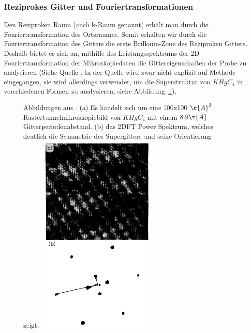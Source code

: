 \subsubsection{Reziprokes Gitter und Fouriertransformationen}
Den Reziproken Raum (auch k-Raum genannt) erhält man durch die
Fouriertransformation des Ortsraumes. Somit erhalten wir durch
die Fouriertransformation des Gitters die erste Brillouin-Zone
des Reziproken Gitters. Deshalb bietet es sich an, mithilfe
des Leistungsspektrums der 2D-Fouriertransformation der 
Mikroskopiedaten die Gittereigenschaften der Probe zu analysieren
(Siehe Quelle \cite{kelty1991scanning}. In der Quelle wird zwar  
nicht explizit auf Methode eingegangen, sie wird allerdings
verwendet, um die Superstruktur von $KHgC_4$ in verschiedenen
Formen zu analysieren, siehe Abbildung~\ref{fig:powerspec}). 
\begin{figure}
    \begin{captionbeside}[]{Abbildungen aus \cite{kelty1991scanning}.
(a) Es handelt sich um eine 100x100 $\r{A}^2$ Rastertunnelmikroskopiebild
von $KHgC_4$ mit einem $8.9 \r{A}$ Gitterperiodenabstand.
(b) das 2DFT Power Spektrum, welches deutlich die Symmetrie des 
Supergitters und seine Orientierung zeigt.} 
\includegraphics[width=6cm]{pics/powerspec}
\end{captionbeside}
\label{fig:powerspec}
\end{figure}


